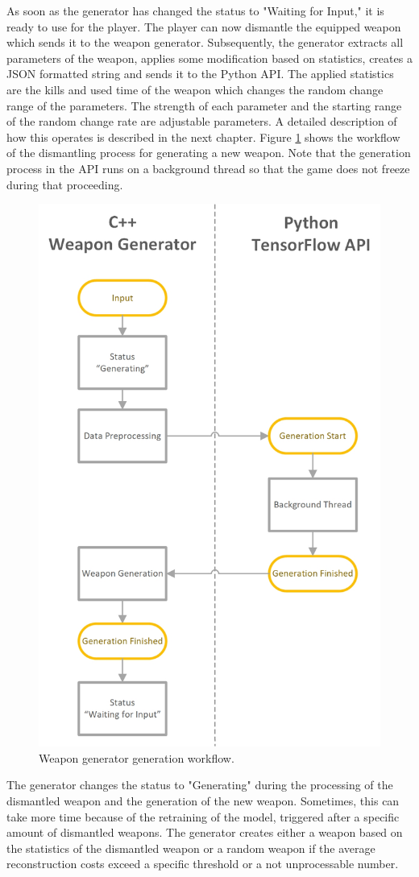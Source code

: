 \documentclass[MGS,Master,english]{twbook}%
\begin{document}
As soon as the generator has changed the status to "Waiting for Input," it is ready to use for the player. The player can now dismantle the equipped weapon which sends it to the weapon generator. Subsequently, the generator extracts all parameters of the weapon, applies some modification based on statistics, creates a \ac{JSON} formatted string and sends it to the Python \ac{API}. The applied statistics are the kills and used time of the weapon which changes the random change range of the parameters. The strength of each parameter and the starting range of the random change rate are adjustable parameters. A detailed description of how this operates is described in the next chapter. Figure \ref{figure::weaponGen::gen} shows the workflow of the dismantling process for generating a new weapon. Note that the generation process in the \ac{API} runs on a background thread so that the game does not freeze during that proceeding.
\begin{figure}[!ht]
	\centering
	\includegraphics[width=0.5\linewidth]{PICs/WeaponGeneratorWorkflow_Generation}
	\caption{Weapon generator generation workflow.} \label{figure::weaponGen::gen}
\end{figure}

The generator changes the status to "Generating" during the processing of the dismantled weapon and the generation of the new weapon. Sometimes, this can take more time because of the retraining of the model, triggered after a specific amount of dismantled weapons. The generator creates either a weapon based on the statistics of the dismantled weapon or a random weapon if the average reconstruction costs exceed a specific threshold or a not unprocessable number.
\end{document}
